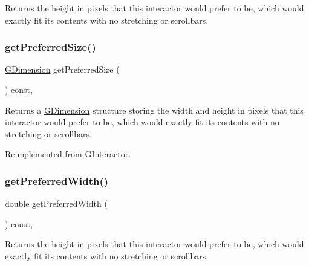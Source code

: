 Returns the height in pixels that this interactor would prefer to be, which would exactly fit its contents with no stretching or scrollbars. 

\mbox{\label{classGContainer_ac0fd6fc35681f935c67ad68078b354b8}} 
\subsubsection{\texorpdfstring{get\+Preferred\+Size()}{getPreferredSize()}}
{\footnotesize\ttfamily \mbox{\hyperlink{structGDimension}{G\+Dimension}} get\+Preferred\+Size (\begin{DoxyParamCaption}{ }\end{DoxyParamCaption}) const\hspace{0.3cm}{\ttfamily [override]}, {\ttfamily [virtual]}}



Returns a \mbox{\hyperlink{structGDimension}{G\+Dimension}} structure storing the width and height in pixels that this interactor would prefer to be, which would exactly fit its contents with no stretching or scrollbars. 



Reimplemented from \mbox{\hyperlink{classGInteractor_a4aabbee761d8e9116275401131b7ccd1}{G\+Interactor}}.

\mbox{\label{classGInteractor_a82bca31d37700fb0e35d2743352efd5e}} 
\subsubsection{\texorpdfstring{get\+Preferred\+Width()}{getPreferredWidth()}}
{\footnotesize\ttfamily double get\+Preferred\+Width (\begin{DoxyParamCaption}{ }\end{DoxyParamCaption}) const\hspace{0.3cm}{\ttfamily [virtual]}, {\ttfamily [inherited]}}



Returns the height in pixels that this interactor would prefer to be, which would exactly fit its contents with no stretching or scrollbars. 

